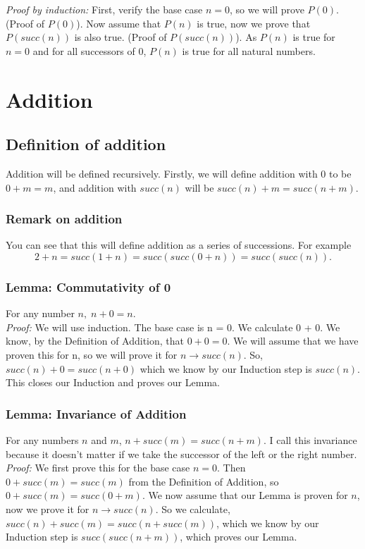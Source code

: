 \textit{Proof by induction:} First, verify the base case $n=0$, so we will prove $P(0)$. (Proof of $P(0)$). Now assume that $P(n)$ is true, now we prove that $P(succ(n))$ is also true. (Proof of $P(succ(n))$). As $P(n)$ is true for $n=0$ and for all successors of 0, $P(n)$ is true for all natural numbers.

\section{Addition}

\subsection{Definition of addition}
Addition will be defined recursively. Firstly, we will define addition with 0 to be $0 + m= m$, and addition with $succ(n)$ will be $succ(n) + m = succ(n+m)$.

\subsubsection*{Remark on addition}
You can see that this will define addition as a series of successions. For example
\begin{equation}
	2 + n = succ(1+n) = succ(succ(0+n)) = succ(succ(n)).
\end{equation}

\subsubsection*{Lemma: Commutativity of 0}
For any number $n,\; n + 0 = n$.\\
\textit{Proof:} We will use induction. The base case is n = 0. We calculate 0 + 0. We know, by the Definition of Addition, that $0+0 = 0$. We will assume that we have proven this for n, so we will prove it for $n\rightarrow succ(n)$. So, $succ(n) + 0 = succ(n + 0)$ which we know by our Induction step is $succ(n)$. This closes our Induction and proves our Lemma.

\subsubsection*{Lemma: Invariance of Addition}
For any numbers $n$ and $m$, $n + succ(m) = succ(n+m)$. I call this invariance because it doesn't matter if we take the successor of the left or the right number.\\
\textit{Proof:} We first prove this for the base case $n=0$. Then $0 + succ(m) = succ(m)$ from the Definition of Addition, so $0 + succ(m) = succ(0 + m)$. We now assume that our Lemma is proven for $n$, now we prove it for $n\rightarrow succ(n)$. So we calculate, $succ(n) + succ(m) = succ(n + succ(m))$, which we know by our Induction step is $succ(succ(n + m))$, which proves our Lemma.

